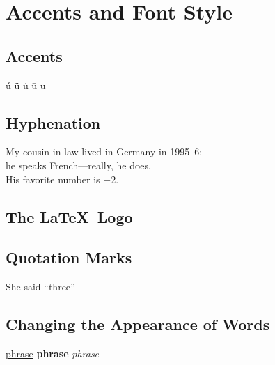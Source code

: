 \documentclass{article}
\begin{document}
\section{Accents and Font Style}
\subsection{Accents}
\'{u} \"{u} \.{u} \={u} \b{u}

\subsection{Hyphenation}
My cousin-in-law lived in Germany in 1995--6;\\
he speaks French---really, he does.\\
His favorite number is $-2$.

\subsection{The \LaTeX\ Logo}
\subsection{Quotation Marks}
She said ``three''

\subsection{Changing the Appearance of Words}
\underline{phrase}
\textbf{phrase}
\emph{phrase}
\end{document}
